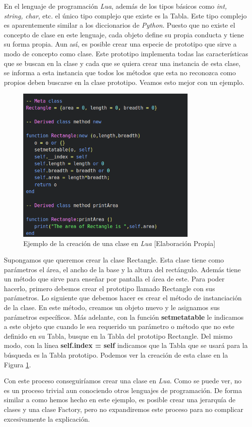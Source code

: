 En el lenguaje de programación \textit{Lua}, además de los tipos básicos como \textit{int, string, char}, etc. el único tipo complejo que existe es la Tabla. Este tipo complejo es aparentemente similar a los diccionarios de \textit{Python}. Puesto que no existe el concepto de clase en este lenguaje, cada objeto define su propia conducta y tiene su forma propia. Aun así, es posible crear una especie de prototipo que sirve a modo de concepto como clase. Este prototipo implementa todas las características que se buscan en la clase y cada que se quiera crear una instancia de esta clase, se informa a esta instancia que todos los métodos que esta no reconozca como propios deben buscarse en la clase prototipo. Veamos esto mejor con un ejemplo.
\begin{figure}[ht]
    \centering
    \includegraphics[width=0.8\textwidth]{img/lua-clases.png}
    \caption{Ejemplo de la creación de una clase en \textit{Lua} [Elaboración Propia]}
    \label{fig:lua-clases}
\end{figure}

Supongamos que queremos crear la clase Rectangle. Esta clase tiene como parámetros el área, el ancho de la base y la altura del rectángulo. Además tiene un método que sirve para enseñar por pantalla el área de este. Para poder hacerlo, primero debemos crear el prototipo llamado Rectangle con sus parámetros. Lo siguiente que debemos hacer es crear el método de instanciación de la clase. En este método, creamos un objeto nuevo y le asignamos sus parámetros específicos. Más adelante, con la función \textbf{setmetatable} le indicamos a este objeto que cuando le sea requerido un parámetro o método que no este definido en su Tabla, busque en la Tabla del prototipo Rectangle. Del mismo modo, con la línea \textbf{self.index = self} indicamos que la Tabla que se usará para la búsqueda es la Tabla prototipo. Podemos ver la creación de esta clase en la Figura \ref {fig:lua-clases}.


Con este proceso conseguiríamos crear una clase en \textit{Lua}. Como se puede ver, no es un proceso trivial aun conociendo otros lenguajes de programación. De forma similar a como hemos hecho en este ejemplo, es posible crear una jerarquía de clases y una clase Factory, pero no expandiremos este proceso para no complicar excesivamente la explicación.

